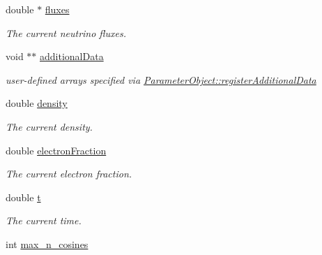 \begin{DoxyCompactItemize}
double $\ast$ \hyperlink{structcudanusquids_1_1Physics_a6a86acb042107ec61f397148f58ebd3b}{fluxes}
\begin{DoxyCompactList}\small\item\em The current neutrino fluxes. \end{DoxyCompactList}\item 
void $\ast$$\ast$ \hyperlink{structcudanusquids_1_1Physics_a5a146906f0901a0493a6d0ad70b6f67d}{additional\+Data}\hypertarget{structcudanusquids_1_1Physics_a5a146906f0901a0493a6d0ad70b6f67d}{}\label{structcudanusquids_1_1Physics_a5a146906f0901a0493a6d0ad70b6f67d}

\begin{DoxyCompactList}\small\item\em user-\/defined arrays specified via \hyperlink{structcudanusquids_1_1ParameterObject_a1c4d9b3219f1a6e563a7c79920148369}{Parameter\+Object\+::register\+Additional\+Data} \end{DoxyCompactList}\item 
double \hyperlink{structcudanusquids_1_1Physics_a64f9aacfcfe1e99356fcc6bde3d38ae2}{density}\hypertarget{structcudanusquids_1_1Physics_a64f9aacfcfe1e99356fcc6bde3d38ae2}{}\label{structcudanusquids_1_1Physics_a64f9aacfcfe1e99356fcc6bde3d38ae2}

\begin{DoxyCompactList}\small\item\em The current density. \end{DoxyCompactList}\item 
double \hyperlink{structcudanusquids_1_1Physics_abb998a60e41ecd017a3ea7e3f729f0ae}{electron\+Fraction}\hypertarget{structcudanusquids_1_1Physics_abb998a60e41ecd017a3ea7e3f729f0ae}{}\label{structcudanusquids_1_1Physics_abb998a60e41ecd017a3ea7e3f729f0ae}

\begin{DoxyCompactList}\small\item\em The current electron fraction. \end{DoxyCompactList}\item 
double \hyperlink{structcudanusquids_1_1Physics_a3778e9fa78cb1a4e999bceaca469bd4d}{t}\hypertarget{structcudanusquids_1_1Physics_a3778e9fa78cb1a4e999bceaca469bd4d}{}\label{structcudanusquids_1_1Physics_a3778e9fa78cb1a4e999bceaca469bd4d}

\begin{DoxyCompactList}\small\item\em The current time. \end{DoxyCompactList}\item 
int \hyperlink{structcudanusquids_1_1Physics_a07951f876d4f364a817222cb85a57aaf}{max\+\_\+n\+\_\+cosines}\hypertarget{structcudanusquids_1_1Physics_a07951f876d4f364a817222cb85a57aaf}{}\label{structcudanusquids_1_1Physics_a07951f876d4f364a817222cb85a57aaf}


\end{DoxyCompactItemize}
